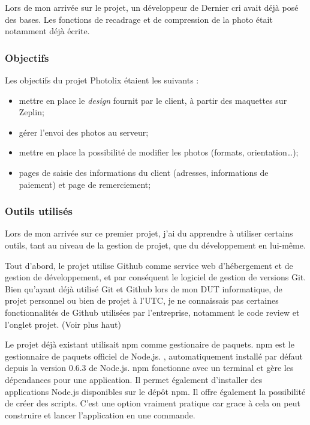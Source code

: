 \bigskip

Lors de mon arrivée sur le projet, un développeur de Dernier cri avait
déjà posé des bases. Les fonctions de recadrage et de compression de la
photo était notamment déjà écrite.

\bigskip

\subsubsection{Objectifs}\label{objectifs}

\bigskip

Les objectifs du projet Photolix étaient les suivants :

\begin{itemize}
\tightlist
\item
  mettre en place le \emph{design} fournit par le client, à partir des
  maquettes sur Zeplin;
\item
  gérer l'envoi des photos au serveur;
\item
  mettre en place la possibilité de modifier les photos (formats,
  orientation\ldots{});
\item
  pages de saisie des informations du client (adresses, informations de
  paiement) et page de remerciement;
\end{itemize}

\bigskip

\subsubsection{Outils utilisés}\label{outils-utilisuxe9s}

\bigskip

Lors de mon arrivée sur ce premier projet, j'ai du apprendre à utiliser
certains outils, tant au niveau de la gestion de projet, que du
développement en lui-même.

\bigskip

Tout d'abord, le projet utilise Github comme service web d'hébergement
et de gestion de développement, et par conséquent le logiciel de gestion
de versions Git. Bien qu'ayant déjà utilisé Git et Github lors de mon
DUT informatique, de projet personnel ou bien de projet à l'UTC, je ne
connaissais pas certaines fonctionnalités de Github utilisées par
l'entreprise, notamment le code review et l'onglet projet. (Voir plus
haut)

\bigskip

Le projet déjà existant utilisait npm comme gestionaire de paquets. npm
est le gestionnaire de paquets officiel de Node.js. , automatiquement
installé par défaut depuis la version 0.6.3 de Node.js. npm fonctionne
avec un terminal et gère les dépendances pour une application. Il permet
également d'installer des applications Node.js disponibles sur le dépôt
npm. Il offre également la possibilité de créer des scripts. C'est une
option vraiment pratique car grace à cela on peut construire et lancer
l'application en une commande.

